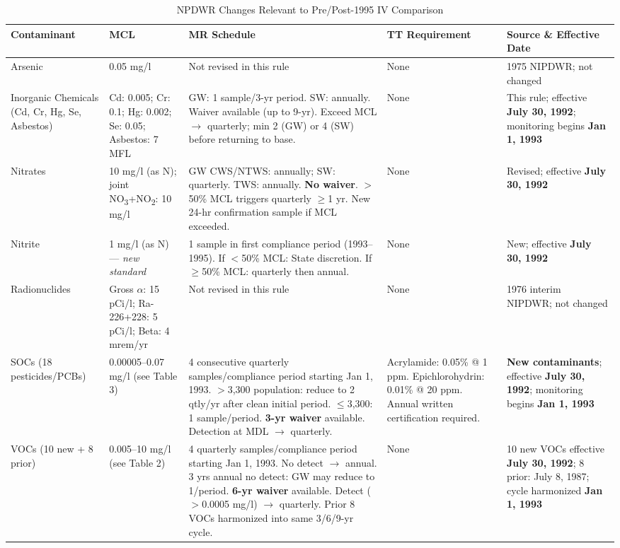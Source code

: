 \begin{table}[htbp]
\centering
\small
\caption{NPDWR Changes Relevant to Pre/Post-1995 IV Comparison}
\label{tab:npdwr_changes}
\begin{tabular}{p{2.5cm}p{3cm}p{5.5cm}p{2.5cm}p{2.5cm}}
\toprule
Contaminant & MCL & MR Schedule & TT Requirement & Source \& Effective Date \\
\midrule
Arsenic & 0.05 mg/l & Not revised in this rule & None & 1975 NIPDWR; not changed \\
\addlinespace
Inorganic Chemicals (Cd, Cr, Hg, Se, Asbestos) & Cd: 0.005; Cr: 0.1; Hg: 0.002; Se: 0.05; Asbestos: 7 MFL & GW: 1 sample/3-yr period. SW: annually. Waiver available (up to 9-yr). Exceed MCL $\rightarrow$ quarterly; min 2 (GW) or 4 (SW) before returning to base. & None & This rule; effective \textbf{July 30, 1992}; monitoring begins \textbf{Jan 1, 1993} \\
\addlinespace
Nitrates & 10 mg/l (as N); joint NO\textsubscript{3}+NO\textsubscript{2}: 10 mg/l & GW CWS/NTWS: annually; SW: quarterly. TWS: annually. \textbf{No waiver}. $>$50\% MCL triggers quarterly $\geq$1 yr. New 24-hr confirmation sample if MCL exceeded. & None & Revised; effective \textbf{July 30, 1992} \\
\addlinespace
Nitrite & 1 mg/l (as N) --- \textit{new standard} & 1 sample in first compliance period (1993--1995). If $<$50\% MCL: State discretion. If $\geq$50\% MCL: quarterly then annual. & None & New; effective \textbf{July 30, 1992} \\
\addlinespace
Radionuclides & Gross $\alpha$: 15 pCi/l; Ra-226+228: 5 pCi/l; Beta: 4 mrem/yr & Not revised in this rule & None & 1976 interim NIPDWR; not changed \\
\addlinespace
SOCs (18 pesticides/PCBs) & 0.00005--0.07 mg/l (see Table 3) & 4 consecutive quarterly samples/compliance period starting Jan 1, 1993. $>$3,300 population: reduce to 2 qtly/yr after clean initial period. $\leq$3,300: 1 sample/period. \textbf{3-yr waiver} available. Detection at MDL $\rightarrow$ quarterly. & Acrylamide: 0.05\% @ 1 ppm. Epichlorohydrin: 0.01\% @ 20 ppm. Annual written certification required. & \textbf{New contaminants}; effective \textbf{July 30, 1992}; monitoring begins \textbf{Jan 1, 1993} \\
\addlinespace
VOCs (10 new + 8 prior) & 0.005--10 mg/l (see Table 2) & 4 quarterly samples/compliance period starting Jan 1, 1993. No detect $\rightarrow$ annual. 3 yrs annual no detect: GW may reduce to 1/period. \textbf{6-yr waiver} available. Detect ($>$0.0005 mg/l) $\rightarrow$ quarterly. Prior 8 VOCs harmonized into same 3/6/9-yr cycle. & None & 10 new VOCs effective \textbf{July 30, 1992}; 8 prior: July 8, 1987; cycle harmonized \textbf{Jan 1, 1993} \\

\end{tabular}
\end{table}
